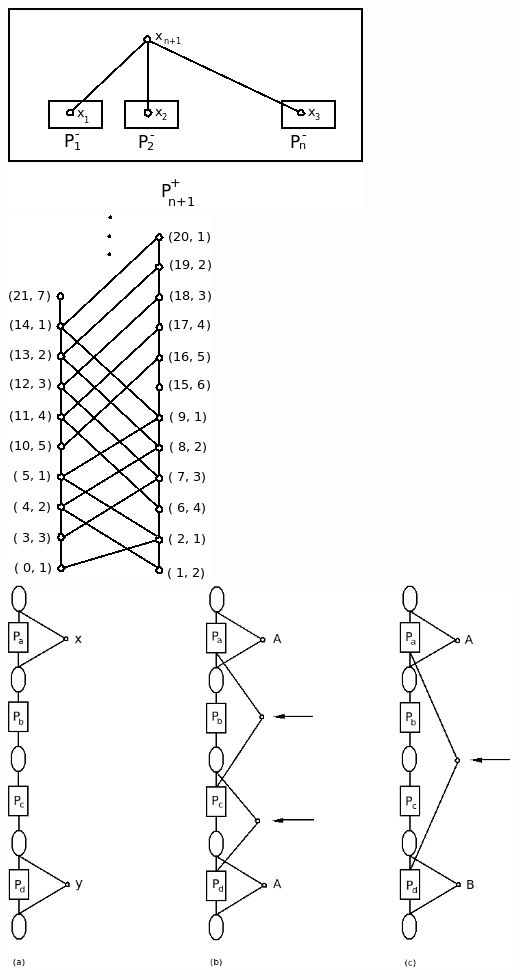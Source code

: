 \documentclass[twoside]{article}
\begin{document}
\newpage
\includegraphics[scale=0.5]{figures/Figure1.png}
\newpage
\includegraphics[scale=0.5]{figures/Figure3.png}
\newpage
\includegraphics[scale=0.5]{figures/Figure5.png}
\end{document}
